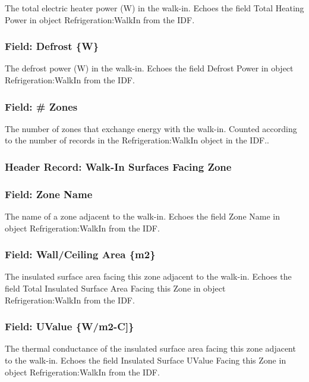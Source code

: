 The total electric heater power (W) in the walk-in. Echoes the field Total Heating Power in object Refrigeration:WalkIn from the IDF.

\subsubsection{Field: Defrost \{W\}}\label{field-defrost-w}

The defrost power (W) in the walk-in. Echoes the field Defrost Power in object Refrigeration:WalkIn from the IDF.

\subsubsection{Field: \# Zones}\label{field-zones}

The number of zones that exchange energy with the walk-in. Counted according to the number of records in the Refrigeration:WalkIn object in the IDF..

\subsubsection{Header Record: Walk-In Surfaces Facing Zone}\label{header-record-walk-in-surfaces-facing-zone}

\subsubsection{Field: Zone Name}\label{field-zone-name-13}

The name of a zone adjacent to the walk-in. Echoes the field Zone Name in object Refrigeration:WalkIn from the IDF.

\subsubsection{Field: Wall/Ceiling Area \{m2\}}\label{field-wallceiling-area-m2}

The insulated surface area facing this zone adjacent to the walk-in. Echoes the field Total Insulated Surface Area Facing this Zone in object Refrigeration:WalkIn from the IDF.

\subsubsection{Field: UValue \{W/m2-C{]}\}}\label{field-uvalue-wm2-c}

The thermal conductance of the insulated surface area facing this zone adjacent to the walk-in. Echoes the field Insulated Surface UValue Facing this Zone in object Refrigeration:WalkIn from the IDF.

